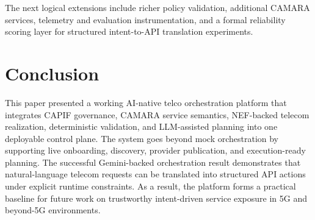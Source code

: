 \documentclass[conference]{IEEEtran}
\begin{document}
The next logical extensions include richer policy validation, additional CAMARA services, telemetry and evaluation instrumentation, and a formal reliability scoring layer for structured intent-to-API translation experiments.

\section{Conclusion}

This paper presented a working AI-native telco orchestration platform that integrates CAPIF governance, CAMARA service semantics, NEF-backed telecom realization, deterministic validation, and LLM-assisted planning into one deployable control plane. The system goes beyond mock orchestration by supporting live onboarding, discovery, provider publication, and execution-ready planning. The successful Gemini-backed orchestration result demonstrates that natural-language telecom requests can be translated into structured API actions under explicit runtime constraints. As a result, the platform forms a practical baseline for future work on trustworthy intent-driven service exposure in 5G and beyond-5G environments.
\end{document}
